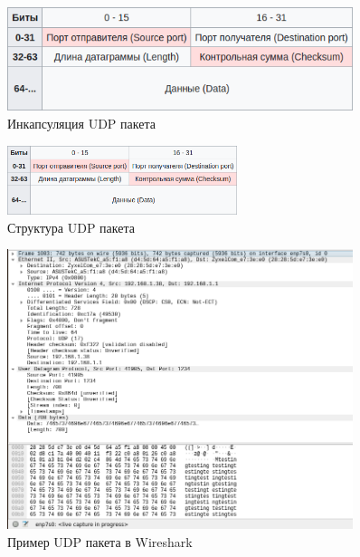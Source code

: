 \begin{figure}[h]
	\centering
	\includegraphics[width=0.9\textwidth]{image/UDP}
	\caption{Инкапсуляция UDP пакета}
	\label{INC_UDP}
\end{figure}

\begin{figure}[h]
	\centering
	\includegraphics[width=0.6\textwidth]{image/udp}
	\caption{Структура UDP пакета}
	\label{UDP_protocol}
\end{figure}

\begin{figure}[h]
	\centering
	\includegraphics[width=0.9\textwidth]{image/example_UDP}
	\caption{Пример UDP пакета в Wireshark}
	\label{IP__exp_protocol}
\end{figure}

